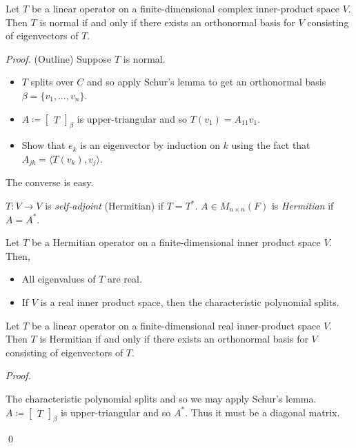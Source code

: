 \documentclass[12pt]{article}
\newenvironment{lemma}[2][Lemma]{\begin{trivlist}
\item[\hskip \labelsep {\bfseries #1}\hskip \labelsep {\bfseries #2.}]}{\end{trivlist}}
\newenvironment{theorem}[2][Theorem]{\begin{trivlist}
\item[\hskip \labelsep {\bfseries #1}\hskip \labelsep {\bfseries #2.}]}{\end{trivlist}}
\newenvironment{definition}[2][Definition]{\begin{trivlist}
\item[\hskip \labelsep {\bfseries #1}\hskip \labelsep {\bfseries #2}]}{\end{trivlist}}
\newenvironment{sol}
    {\emph{Proof.}
    }
    {
    \qed
    }
\begin{document}
\begin{theorem}{6.16}
Let $T$ be a linear operator on a finite-dimensional complex inner-product space $V$. Then $T$ is normal if and only if there exists an orthonormal basis for $V$ consisting of eigenvectors of $T$.
\end{theorem}

\textit{Proof.} (Outline) Suppose $T$ is normal.

\begin{itemize}
    \item $T$ splits over $C$ and so apply Schur's lemma to get an orthonormal basis $\beta = \{v_1, \dots, v_n\}$.
    
    \item $A \coloneqq \begin{bmatrix} T \end{bmatrix}_\beta$ is upper-triangular and so $T(v_1) = A_{11}v_1$.
    
    \item Show that $e_k$ is an eigenvector by induction on $k$ using the fact that $A_{jk} = \langle T(v_k), v_j \rangle$.
\end{itemize}

The converse is easy.

\begin{definition}{8}
$T : V \to V$ is \textit{self-adjoint} (Hermitian) if $T = T^*$. $A \in M_{n \times n}(F)$ is \textit{Hermitian} if $A = A^*$. 
\end{definition}

\begin{lemma}{19}
Let $T$ be a Hermitian operator on a finite-dimensional inner product space $V$. Then,

\begin{itemize}
    \item[(a)] All eigenvalues of $T$ are real.
    
    \item[(b)] If $V$ is a real inner product space, then the characteristic polynomial splits.
\end{itemize}
\end{lemma}

\begin{theorem}{6.17}
Let $T$ be a linear operator on a finite-dimensional real inner-product space $V$. Then $T$ is Hermitian if and only if there exists an orthonormal basis for $V$ consisting of eigenvectors of $T$.
\end{theorem}

\begin{sol}
The characteristic polynomial splits and so we may apply Schur's lemma. $A \coloneqq \begin{bmatrix} T \end{bmatrix}_\beta$ is upper-triangular and so $A^*$. Thus it must be a diagonal matrix.
\end{sol}
\end{document}
